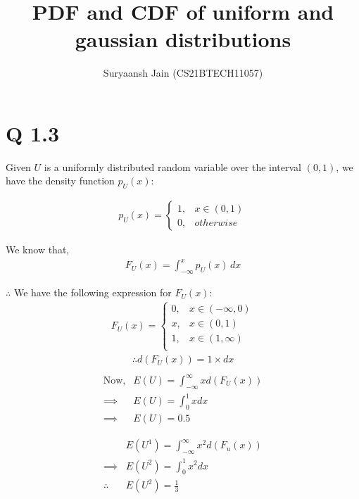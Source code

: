 \documentclass[journal,12pt,twocolumn]{IEEEtran}
\title{PDF and CDF of uniform and gaussian distributions}
\author{Suryaansh Jain (CS21BTECH11057)}
\date{}
\begin{document}
\maketitle

\section{Q 1.3}
\noindent Given $U$ is a uniformly distributed random variable over the interval $(0, 1)$, we have the density function $p_U(x)$:

\begin{align}
	p_U(x) =
            \begin{cases}
    		1, & x \in (0, 1) \\
    		0, & otherwise
	    \end{cases}
    	\label{eq:PDF}
\end{align}

We know that,
\begin{align}
    F_U(x) = \int_{-\infty}^{x} p_U(x) \,dx
    \label{eq:Relation}
\end{align}

\noindent $\therefore$ We have the following expression for $F_U(x)$:
\begin{align}
    F_U(x) =
	    \begin{cases}
	    	0, & x \in (-\infty, 0) \\
  	    	x, & x \in (0, 1) \\
    		1, & x \in (1, \infty)\\
            \end{cases}
\end{align}
\begin{align}
    \therefore d(F_U(x)) = 1 \times dx\\
\end{align}
\begin{align}
    \text{Now,}&E(U) = \int _ {-\infty} ^ {\infty} {x d(F_U(x))}\\
    \implies &E(U) = \int _ {0} ^ {1} {x dx}\\
    \implies &E(U) = 0.5
\end{align}

\begin{align}
    &E(U^1) = \int _ {- \infty} ^ {\infty} {x^2 d(F_u(x))} \\
    \implies &E(U^2) = \int _ {0} ^ {1} {x^2 dx} \\
    \therefore &E(U^2) = \frac{1}{3}
\end{align}
\end{document}
